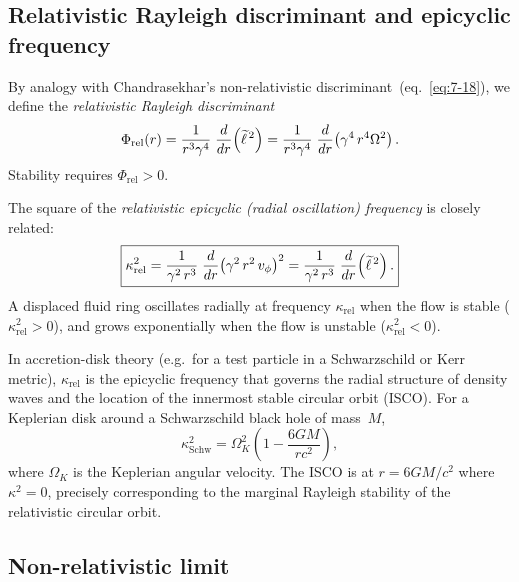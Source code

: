 \subsection{Relativistic Rayleigh discriminant and epicyclic frequency}
\label{sec:rel-7-66c}

By analogy with Chandrasekhar's non-relativistic
discriminant~(eq.~\eqref{eq:7-18}), we define the
\emph{relativistic Rayleigh discriminant}
\begin{equation}
\label{eq:rel-7-16}
\Phi_{\mathrm{rel}}(r) = \frac{1}{r^{3}\gamma^{4}}\;
  \frac{d}{dr}\!\left(\widetilde{\ell}^{\,2}\right)
= \frac{1}{r^{3}\gamma^{4}}\;
  \frac{d}{dr}\!\left(\gamma^{4}\,r^{4}\Omega^{2}\right).
\end{equation}
Stability requires $\Phi_{\mathrm{rel}}>0$.

The square of the \emph{relativistic epicyclic (radial oscillation)
frequency} is closely related:
\begin{equation}
\label{eq:rel-7-17}
\boxed{\kappa_{\mathrm{rel}}^{2}
= \frac{1}{\gamma^{2}\,r^{3}}\;\frac{d}{dr}\!\left(
  \gamma^{2}\,r^{2}\,v_{\phi}\right)^{2}
= \frac{1}{\gamma^{2}\,r^{3}}\;\frac{d}{dr}\!\left(
  \widetilde{\ell}^{\,2}\right).}
\end{equation}
A displaced fluid ring oscillates radially at frequency
$\kappa_{\mathrm{rel}}$ when the flow is stable
($\kappa_{\mathrm{rel}}^{2}>0$), and grows exponentially when the
flow is unstable ($\kappa_{\mathrm{rel}}^{2}<0$).

In accretion-disk theory (e.g.\ for a test particle in a
Schwarzschild or Kerr metric), $\kappa_{\mathrm{rel}}$ is the
epicyclic frequency that governs the radial structure of density
waves and the location of the innermost stable circular orbit (ISCO).
For a Keplerian disk around a Schwarzschild black hole of mass~$M$,
\begin{equation}
\label{eq:rel-7-18}
\kappa_{\mathrm{Schw}}^{2}
= \Omega_{K}^{2}\!\left(1 - \frac{6GM}{rc^{2}}\right),
\end{equation}
where $\Omega_{K}$ is the Keplerian angular velocity.  The ISCO is at
$r=6GM/c^{2}$ where $\kappa^{2}=0$, precisely corresponding to the
marginal Rayleigh stability of the relativistic circular orbit.

\subsection{Non-relativistic limit}
\label{sec:rel-7-66d}

